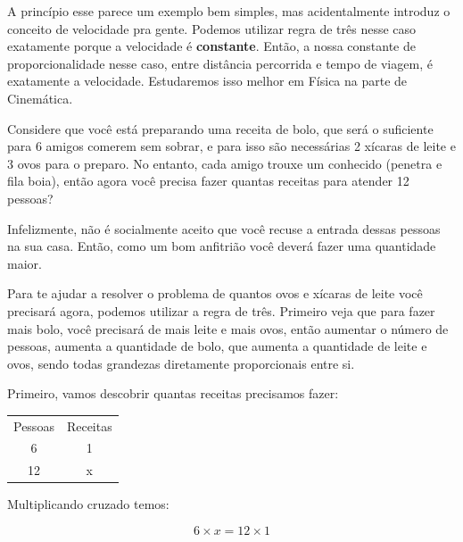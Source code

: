 A princípio esse parece um exemplo bem simples, mas acidentalmente introduz o conceito de velocidade pra gente. Podemos utilizar regra de três nesse caso exatamente porque a velocidade é \textbf{constante}. Então, a nossa constante de proporcionalidade nesse caso, entre distância percorrida e tempo de viagem, é exatamente a velocidade. Estudaremos isso melhor em Física na parte de Cinemática.

\begin{exemplo}
    Considere que você está preparando uma receita de bolo, que será o suficiente para 6 amigos comerem sem sobrar, e para isso são necessárias 2 xícaras de leite e 3 ovos para o preparo. No entanto, cada amigo trouxe um conhecido (penetra e fila boia), então agora você precisa fazer quantas receitas para atender 12 pessoas?
    
    \vspace{0.2cm}
    
    Infelizmente, não é socialmente aceito que você recuse a entrada dessas pessoas na sua casa. Então, como um bom anfitrião você deverá fazer uma quantidade maior.
    
    \vspace{0.2cm}
    
    Para te ajudar a resolver o problema de quantos ovos e xícaras de leite você precisará agora, podemos utilizar a regra de três. Primeiro veja que para fazer mais bolo, você precisará de mais leite e mais ovos, então aumentar o número de pessoas, aumenta a quantidade de bolo, que aumenta a quantidade de leite e ovos, sendo todas grandezas diretamente proporcionais entre si.
    
    \vspace{0.2cm}
    
    Primeiro, vamos descobrir quantas receitas precisamos fazer:

    \begin{table}[H]
        \centering
        \begin{tabular}{cc}
            Pessoas & Receitas \\
            6 & 1\\
            12 & x 
        \end{tabular}

    \end{table}

    Multiplicando cruzado temos:

    \begin{equation}
        6\times x=12 \times 1
    \end{equation}


\end{exemplo}
